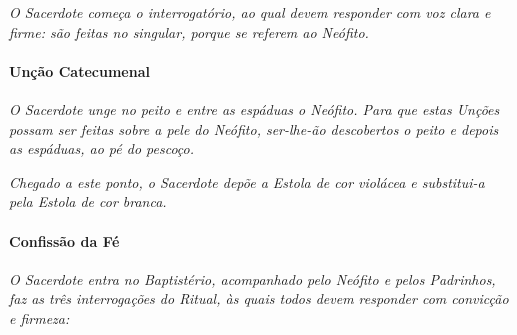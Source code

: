 \textit{O Sacerdote começa o interrogatório, ao qual devem responder com voz clara e firme: são feitas no singular, porque se referem ao Neófito.}

\begin{paracol}{2}\switchcolumn{}\switchcolumn*{}\switchcolumn{}\switchcolumn*{}\switchcolumn{}\switchcolumn*{}\switchcolumn{}\switchcolumn*{}\switchcolumn{}\switchcolumn*{}\switchcolumn{}\end{paracol}

\paragraph{Unção Catecumenal}

\textit{O Sacerdote unge no peito e entre as espáduas o Neófito. Para que estas Unções possam ser feitas sobre a pele do Neófito, ser-lhe-ão descobertos o peito e depois as espáduas, ao pé do pescoço.}

\begin{paracol}{2}\switchcolumn{}\switchcolumn*{}\switchcolumn{}\end{paracol}

\textit{Chegado a este ponto, o Sacerdote depõe a Estola de cor violácea e substitui-a pela Estola de cor branca.}

\paragraph{Confissão da Fé}

\textit{O Sacerdote entra no Baptistério, acompanhado pelo Neófito e pelos Padrinhos, faz as três interrogações do Ritual, às quais todos devem responder com convicção e firmeza:}

